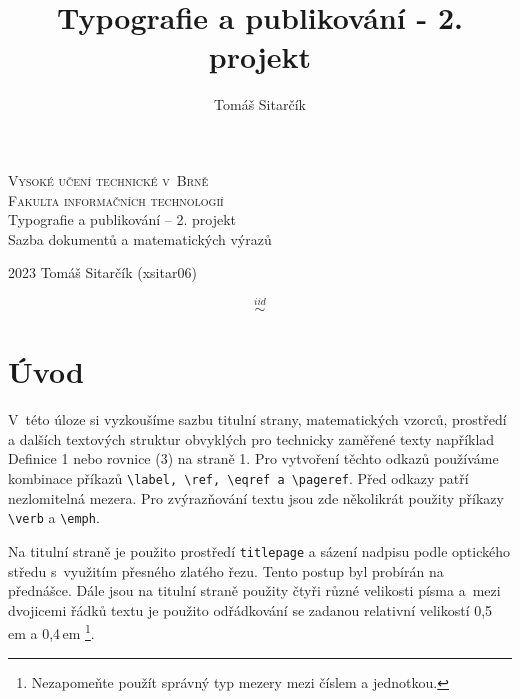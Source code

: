 \documentclass[11pt, twocolumn, a4paper]{article}
\title{Typografie a publikování - 2. projekt}
\author{Tomáš Sitarčík}
\theoremstyle{definition}
\begin{document}
 
\begin{titlepage}
    \begin{center}
 
        \Huge
        \textsc{Vysoké učení technické v~Brně\\Fakulta informačních technologií} \\
        \LARGE
        Typografie a publikování -- 2. projekt\\Sazba dokumentů a matematických výrazů
      
        {\LARGE 2023 \hfill Tomáš Sitarčík (xsitar06)}
    
    \end{center}
\end{titlepage}


\newpage
\twocolumn

$$\overset{iid}{\sim}$$

\section*{Úvod}
V~této úloze si vyzkoušíme sazbu titulní strany, matematických vzorců, prostředí a dalších 
textových struktur obvyklých pro technicky zaměřené texty například Definice 1 nebo rovnice
(3) na straně 1. Pro vytvoření těchto odkazů používáme kombinace příkazů
\verb|\label, \ref, \eqref a \pageref|. Před odkazy patří nezlomitelná mezera. Pro
zvýrazňování textu jsou zde několikrát použity příkazy \verb|\verb| a \verb|\emph|.

Na titulní straně je použito prostředí \verb|titlepage| a sázení nadpisu podle optického
středu s~využitím přesného zlatého řezu. Tento postup byl probírán na přednášce. Dále
jsou na titulní straně použity čtyři různé velikosti písma a~mezi dvojicemi řádků textu
je použito odřádkování se zadanou relativní velikostí 0,5\,em a 0,4\,em 
\footnote[1]{Nezapomeňte použít správný typ mezery mezi číslem a jednotkou.}.
\end{document}
